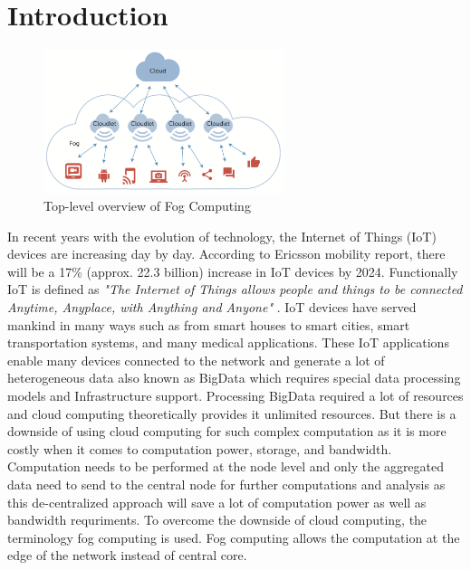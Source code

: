 \section{Introduction}
\label{sec:introduction}
\begin{figure}
  \centering
  \includegraphics[width=70mm]{figures/mlcn-fog-1.pdf}
  \caption{Top-level overview of Fog Computing\cite{Bittencourt2017}}
  \label{fig:fog-arch}
\end{figure}
In recent years with the evolution of technology, the Internet of Things (IoT) devices are increasing day by day. According to Ericsson mobility report\cite{erricssonreport}, there will be a 17\% (approx. 22.3 billion) increase in IoT devices by 2024. Functionally IoT is defined as \emph{"The Internet of Things allows people and things to be connected Anytime, Anyplace, with Anything and Anyone"} \cite{euiotdef}. IoT devices have served mankind in many ways such as from smart houses to smart cities, smart transportation systems, and many medical applications. These IoT applications enable many devices connected to the network and generate a lot of heterogeneous data also known as BigData which requires special data processing models and Infrastructure support\cite{Bittencourt2017}. Processing BigData required a lot of resources and cloud computing theoretically provides it unlimited resources\cite{10.1145/3057266}. But there is a downside of using cloud computing for such complex computation as it is more costly when it comes to computation power, storage, and bandwidth\cite{10.1145/3057266}. Computation needs to be performed at the node level and only the aggregated data need to send to the central node for further computations and analysis as this de-centralized approach will save a lot of computation power as well as bandwidth requriments\cite{10.1145/3057266}. To overcome the downside of cloud computing, the terminology fog computing is used. Fog computing allows the computation at the edge of the network instead of central core\cite{10.1145/3057266}. \par
